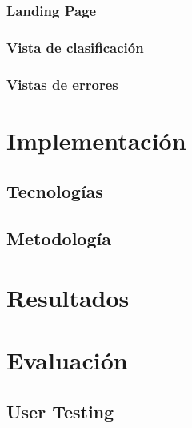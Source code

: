 \subsubsection{Landing Page}

\subsubsection{Vista de clasificación}

\subsubsection{Vistas de errores}

\section{Implementación}

\subsection{Tecnologías}

\subsection{Metodología}

\section{Resultados}

\section{Evaluación}

\subsection{User Testing}

